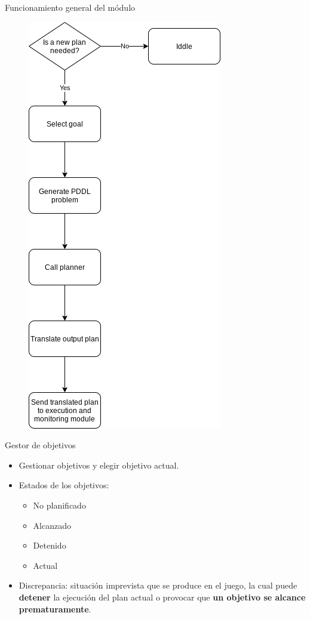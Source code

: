 \documentclass[11pt]{beamer}    %
\begin{document}
    \begin{frame}{Funcionamiento general del módulo}
        \begin{figure}
            \centering
            \includegraphics[scale=0.3]{img/presentation/planning_flux}
        \end{figure}
    \end{frame}

    \begin{frame}{Gestor de objetivos}
        \begin{itemize}
            \item Gestionar objetivos y elegir objetivo actual.
            \item Estados de los objetivos:
            \begin{itemize}
                \item \alert{No planificado}
                \item \alert{Alcanzado}
                \item \alert{Detenido}
                \item \alert{Actual}
            \end{itemize}
            \item \alert{Discrepancia}: situación imprevista que se produce en el juego, la
            cual puede \textbf{detener} la ejecución del plan actual o provocar que
            \textbf{un objetivo se alcance prematuramente}.
        \end{itemize}
    \end{frame}
\end{document}
